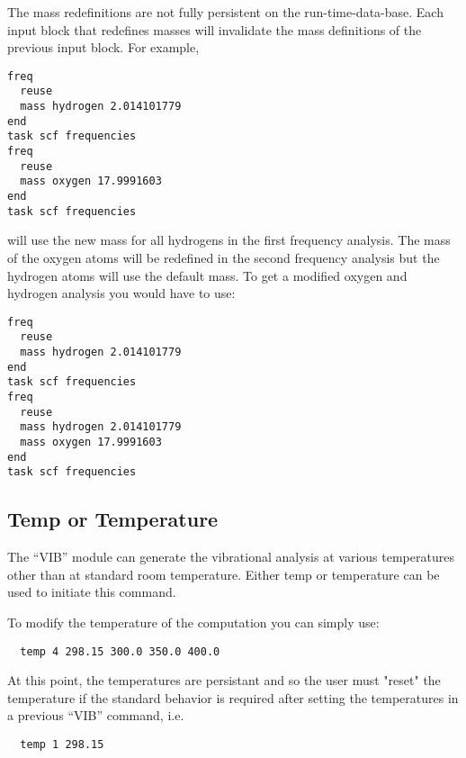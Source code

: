 The mass redefinitions are not fully persistent on the
run-time-data-base.  Each input block that redefines masses will
invalidate the mass definitions of the previous input block.
For example, 
\begin{verbatim}
freq
  reuse
  mass hydrogen 2.014101779
end
task scf frequencies
freq
  reuse
  mass oxygen 17.9991603
end
task scf frequencies
\end{verbatim}
will use the new mass for all hydrogens in the first frequency
analysis.  The mass of the oxygen atoms will be redefined in the second
frequency analysis but the hydrogen atoms will use the default mass.
To get a modified oxygen and hydrogen analysis you would have to use:
\begin{verbatim}
freq
  reuse
  mass hydrogen 2.014101779
end
task scf frequencies
freq
  reuse
  mass hydrogen 2.014101779
  mass oxygen 17.9991603
end
task scf frequencies
\end{verbatim}

\subsection{Temp or Temperature}
The ``VIB'' module can generate the vibrational analysis at various
temperatures other than at standard room temperature.  Either
temp or temperature can be used to initiate this command.

To modify the temperature of the computation you can simply use:
\begin{verbatim}
  temp 4 298.15 300.0 350.0 400.0
\end{verbatim}

At this point, the temperatures are persistant and so the user 
must "reset" the temperature if the standard behavior is required
after setting the temperatures in a previous ``VIB'' command, i.e.
\begin{verbatim}
  temp 1 298.15
\end{verbatim}

